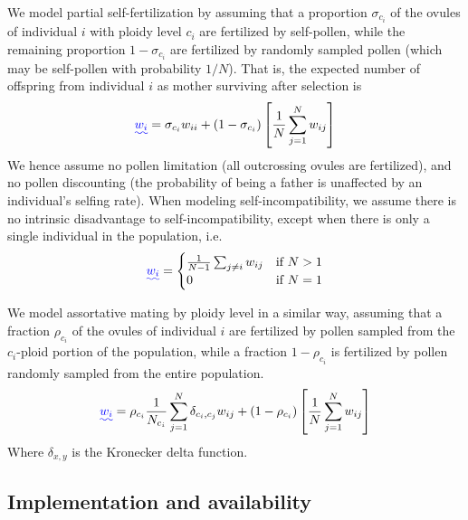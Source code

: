 \documentclass[12pt,a4paper]{article}
\providecommand{\DIFadd}[1]{{\protect\color{blue}\uwave{#1}}} %
\providecommand{\DIFaddbegin}{} %
\providecommand{\DIFaddend}{} %
\providecommand{\DIFdelbegin}{} %
\providecommand{\DIFdelend}{} %
\begin{document}
    We model partial self-fertilization by assuming that a proportion
    $\sigma_{c_i}$ of the ovules of individual $i$ with ploidy level $c_i$ are
    fertilized by self-pollen, while the remaining proportion $1-\sigma_{c_i}$ are
    fertilized by randomly sampled pollen (which may be self-pollen with
    probability $1/N$). 
    That is, the expected number of offspring from individual $i$ as mother
    surviving after selection is
    \begin{equation}
    \DIFdelbegin %
\DIFdelend \DIFaddbegin \DIFadd{w_i }\DIFaddend = \sigma_{c_i} w_{ii} +
      (1-\sigma_{c_i})\left[\frac{1}{N}\sum_{j=1}^N w_{ij}\right]
    \end{equation}
    We hence assume no pollen limitation (all outcrossing ovules are fertilized),
    and no pollen discounting (the probability of being a father is unaffected by
    an individual's selfing rate).
    When modeling self-incompatibility, we assume there is no intrinsic
    disadvantage to self-incompatibility, except when there is only a single
    individual in the population, i.e.
    \begin{equation}
    \DIFdelbegin %
\DIFdelend \DIFaddbegin \DIFadd{w_i }\DIFaddend = \begin{cases}
        \frac{1}{N-1}\sum_{j \ne i }w_{ij} & \text{if } N > 1\\ 
        0 & \text{if } N=1 \end{cases}
    \end{equation}

    We model assortative mating by ploidy level in a similar way, assuming that a
    fraction $\rho_{c_i}$ of the ovules of individual $i$ are fertilized by pollen
    sampled from the $c_i$-ploid portion of the population, while a fraction
    $1-\rho_{c_i}$ is fertilized by pollen randomly sampled from the entire
    population.
    \begin{equation}
    \DIFdelbegin %
\DIFdelend \DIFaddbegin \DIFadd{w_i }\DIFaddend = \rho_{c_i} \frac{1}{N_{c_{i}}} \sum_{j=1}^N \delta_{c_i,c_j}w_{ij}
     + (1-\rho_{c_i})
    \left[\frac{1}{N}\sum_{j=1}^N w_{ij}\right]
    \end{equation}
    Where $\delta_{x,y}$ is the Kronecker delta function.

    \subsection*{Implementation and availability}
\end{document}

